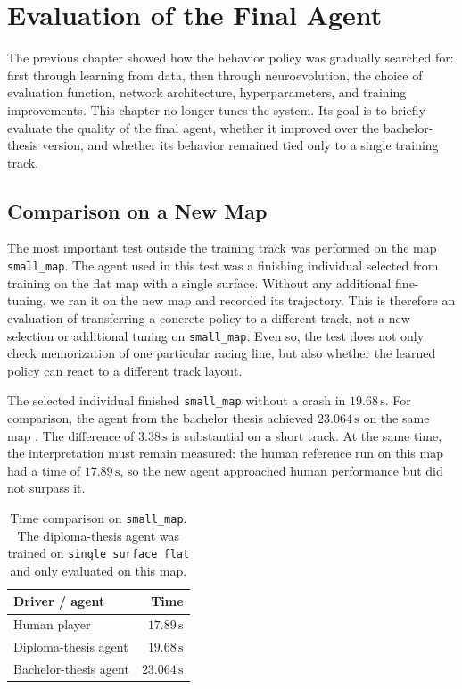 \chapter{Evaluation of the Final Agent}
\label{chap:vyhodnotenie_agenta}

The previous chapter showed how the behavior policy was gradually searched for: first through learning from data, then through neuroevolution, the choice of evaluation function, network architecture, hyperparameters, and training improvements. This chapter no longer tunes the system. Its goal is to briefly evaluate the quality of the final agent, whether it improved over the bachelor-thesis version, and whether its behavior remained tied only to a single training track.

\section{Comparison on a New Map}

The most important test outside the training track was performed on the map \texttt{small\_map}. The agent used in this test was a finishing individual selected from training on the flat map with a single surface. Without any additional fine-tuning, we ran it on the new map and recorded its trajectory. This is therefore an evaluation of transferring a concrete policy to a different track, not a new selection or additional tuning on \texttt{small\_map}. Even so, the test does not only check memorization of one particular racing line, but also whether the learned policy can react to a different track layout.

The selected individual finished \texttt{small\_map} without a crash in \(19.68\,\mathrm{s}\). For comparison, the agent from the bachelor thesis achieved \(23.064\,\mathrm{s}\) on the same map \cite{melkovic2024bachelor}. The difference of \(3.38\,\mathrm{s}\) is substantial on a short track. At the same time, the interpretation must remain measured: the human reference run on this map had a time of \(17.89\,\mathrm{s}\), so the new agent approached human performance but did not surpass it.

\begin{table}[htbp]
    \centering
    \renewcommand{\arraystretch}{1.12}
    \caption[Time comparison on \texttt{small\_map}]{Time comparison on \texttt{small\_map}. The diploma-thesis agent was trained on \texttt{single\_surface\_flat} and only evaluated on this map.}
    \label{tab:evaluation_small_map_times}
    \begin{tabular}{lr}
        \toprule
        Driver / agent & Time \\
        \midrule
        Human player & \(17.89\,\mathrm{s}\) \\
        Diploma-thesis agent & \(19.68\,\mathrm{s}\) \\
        Bachelor-thesis agent & \(23.064\,\mathrm{s}\) \\
        \bottomrule
    \end{tabular}
\end{table}

